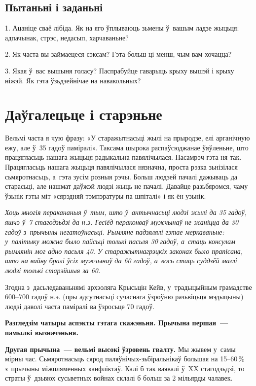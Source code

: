 \subsection*{Пытаньні і заданьні}

1. Ацаніце сваё лібіда. Як на яго ўплываюць зьмены ў~вашым ладзе жыцьця: адпачынак, стрэс, недасып, харчаваньне?

2. Як часта вы займаецеся сэксам? Гэта больш ці менш, чым вам хочацца?

3. Якая ў~вас вышыня голасу? Паспрабуйце гаварыць крыху вышэй і крыху ніжэй. Як гэта ўзьдзейнічае на навакольных?


\section{Даўгалецьце і старэньне}

Вельмі часта я чую фразу: «У старажытнасьці жылі на прыродзе, елі арганічную ежу, але ў~35 гадоў паміралі». Таксама шырока распаўсюджанае ўяўленьне, што працягласьць нашага жыцьця радыкальна павялічылася. Насамрэч гэта ня так. Працягласьць нашага жыцьця павялічылася нязначна, проста рэзка зьнізілася сьмяротнасьць, а~гэта зусім розныя рэчы. Больш людзей пачалі дажываць да старасьці, але нашмат даўжэй людзі жыць не пачалі. Давайце разьбяромся, чаму ўзьнік гэты міт «сярэдняй тэмпэратуры па шпіталі» і як ён узьнік.

\emph{Хоць многія перакананыя ў~тым, што ў~антычнасьці людзі жылі да 35 гадоў, яшчэ ў~7 стагодзьдзі да н.э. Гесіёд пераконваў мужчынаў не жаніцца да 30 гадоў з~прычыны негатоўнасьці. Рымляне падзялялі гэтае меркаваньне: у~палітыку можна было пайсьці толькі пасьля 30 гадоў, а~стаць консулам рымлянін мог адно пасьля 40. У старажытнагрэцкіх законах было прапісана, што на вайну бралі ўсіх мужчынаў да 60 гадоў, а~вось стаць суддзёй маглі людзі толькі старэйшыя за 60.}

Згодна з~дасьледаваньнямі архэоляга Крысьцін Кейв, у~традыцыйным грамадстве 600--700 гадоў н.э. (пры адсутнасьці сучаснага ўзроўню разьвіцьця мэдыцыны) людзі даволі часта паміралі ва ўзросьце 70 гадоў.

\textbf{Разгледзім чатыры аспэкты гэтага скажэньня. Прычына першая~--- памылкі вызначэньня.}

\textbf{Другая прычына~--- вельмі высокі ўзровень гвалту.} Мы жывем у~самы мірны час. Сьмяротнасьць сярод паляўнічых-зьбіральнікаў большая на 15--60\,\% з~прычыны міжпляменных канфліктаў. Калі б так ваявалі ў~XX стагодзьдзі, то страты ў~дзьвюх сусьветных войнах склалі б больш за 2 мільярды чалавек. 

